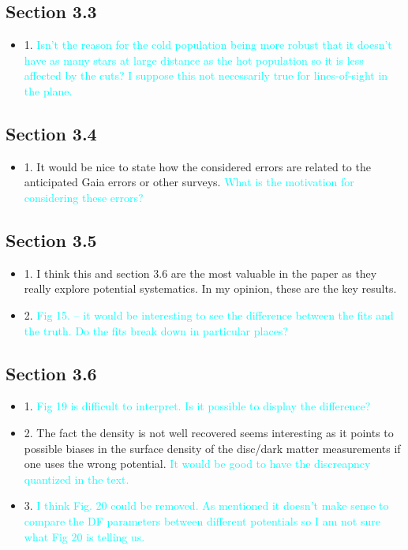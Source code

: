 \documentclass[10pt,a4paper]{article}
\newcommand{\HW}[1]{\textcolor{Cyan}{#1}}
\begin{document}
\subsection{Section 3.3}
\begin{itemize}
\item 1. \HW{Isn't the reason for the cold population being more robust that it doesn't have as many stars at large distance as the hot population so it is less affected by the cuts? I suppose this not necessarily true for lines-of-sight in the plane.}
\end{itemize}

\subsection{Section 3.4}
\begin{itemize}
\item 1. It would be nice to state how the considered errors are related to the anticipated Gaia errors or other surveys. \HW{What is the motivation for considering these errors?}
\end{itemize}

\subsection{Section 3.5}
\begin{itemize}
\item 1. I think this and section 3.6 are the most valuable in the paper as they really explore potential systematics. In my opinion, these are the key results.
\item 2. \HW{Fig 15. -- it would be interesting to see the difference between the fits and the truth. Do the fits break down in particular places?}
\end{itemize}

\subsection{Section 3.6}
\begin{itemize}
\item 1. \HW{Fig 19 is difficult to interpret. Is it possible to display the difference?}
\item 2. The fact the density is not well recovered seems interesting as it points to possible biases in the surface density of the disc/dark matter measurements if one uses the wrong potential. \HW{It would be good to have the discreapncy quantized in the text.}
\item 3. \HW{I think Fig. 20 could be removed. As mentioned it doesn't make sense to compare the DF parameters between different potentials so I am not sure what Fig 20 is telling us.}
\end{itemize}
\end{document}

